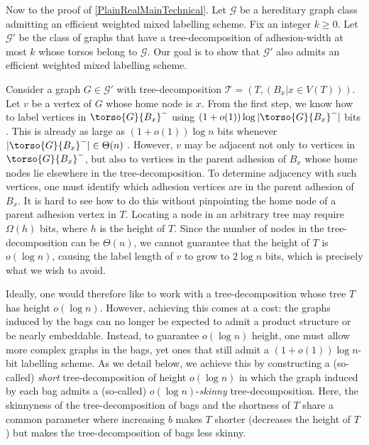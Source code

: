  


Now to the proof of \cref{PlainRealMainTechnical}. Let $\mathcal{G}$ be a hereditary graph class admitting an efficient weighted mixed labelling scheme. Fix an integer $k\geq 0$. Let $\mathcal{G'}$ be the class of graphs that have a tree-decomposition of adhesion-width at most $k$ whose torsos belong to $\mathcal{G}$. Our goal is to show that $\mathcal{G'}$ also admits an efficient weighted mixed labelling scheme.

Consider a graph $G\in \mathcal{G}'$ with tree-decomposition $\mathcal{T} = (T , (B_x | x \in V (T )))$. Let $v$ be a vertex  of $G$ whose home node is $x$. From the first step, we know how to label vertices in $\torso{G}{B_x}^-$ using $(1+o(1))\log|\torso{G}{B_x}^-|$ bits . This is already as large as $(1+o(1))\log n$ bits whenever $|\torso{G}{B_x}^-|\in \Theta(n)$ . However, $v$ may be adjacent not only to vertices in $\torso{G}{B_x}^-$, but also to vertices in the parent adhesion of $B_x$ whose home nodes lie elsewhere in the tree-decomposition. To determine adjacency with such vertices, one must identify which adhesion vertices are in the parent adhesion of $B_x$. It is hard to see how to do this without pinpointing the home node of a parent adhesion vertex in $T$. Locating a node in an arbitrary tree may require $\Omega(h)$ bits, where $h$ is the height of $T$.  Since the number of nodes in the tree-decomposition can be $\Theta(n)$, we cannot guarantee that the height of $T$ is $o(\log n)$, causing the label length of $v$ to grow to $2\log n$ bits, which is precisely what we wish to avoid.


Ideally, one would therefore like to work with a tree-decomposition whose tree $T$ has height $o(\log n)$. However, achieving this comes at a cost: the graphs induced by the bags can no longer be expected to admit a product structure or be nearly embeddable. Instead, to guarantee $o(\log n)$ height, one must allow more complex graphs in the bags, yet ones that still admit a $(1+o(1))\log n$-bit labelling scheme. As we detail below, we achieve this by constructing a (so-called) \emph{short} tree-decomposition of height $o(\log n)$ in which the graph induced by each bag admits a (so-called) $o(\log n)$-\emph{skinny} tree-decomposition.  Here, the skinnyness of the tree-decomposition of bags and the shortness of $T$ share a common parameter  where increasing $b$ makes $T$ shorter (decreases the height of $T$) but makes the tree-decomposition of bags less skinny.



